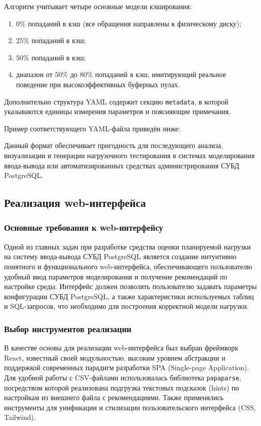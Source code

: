 Алгоритм учитывает четыре основные модели кэширования:
\begin{enumerate}
    \item $0\%$ попаданий в кэш (все обращения направлены к физическому диску);
    \item $25\%$ попаданий в кэш;
    \item $50\%$ попаданий в кэш;
    \item диапазон от $50\%$ до $80\%$ попаданий в кэш, имитирующий реальное поведение при высокоэффективных буферных пулах.
\end{enumerate}

Дополнительно структура YAML содержит секцию \texttt{metadata}, в которой указываются единицы измерения параметров и поясняющие примечания.

Пример соответствующего YAML-файла приведён ниже:

Данный формат обеспечивает пригодность для последующего анализа, визуализации и генерации нагрузочного тестирования в системах моделирования ввода-вывода или автоматизированных средствах администрирования СУБД PostgreSQL.




\subsection{Реализация web-интерфейса}
\subsubsection{Основные требования к web-интерфейсу}

Одной из главных задач при разработке средства оценки пла\-ни\-руемой наг\-руз\-ки на систему ввода-вывода СУБД PostgreSQL является создание интуитивно понятного и функционального web-интерфейса, обеспечивающего пользователю удобный ввод параметров моделирования и получение рекомендаций по настройке среды. Интерфейс должен позволять пользователю задавать параметры конфигурации СУБД PostgreSQL, а также характеристики используемых таблиц и SQL-запросов, что необходимо для построения корректной модели нагрузки.


\subsubsection{Выбор инструментов реализации}

В качестве основы для реализации web-интерфейса был выбран фреймворк React, известный своей модульностью, высоким уровнем абстракции и поддержкой современных парадигм разработки SPA (Single-page Application). Для удобной работы с CSV-файлами использовалась библиотека \texttt{papaparse}, посредством которой реализована подгрузка текстовых подсказок (hints) по настройкам из внешнего файла с рекомендациями. Также применялись инструменты для унификации и стилизации пользовательского интерфейса (CSS, Tailwind).

